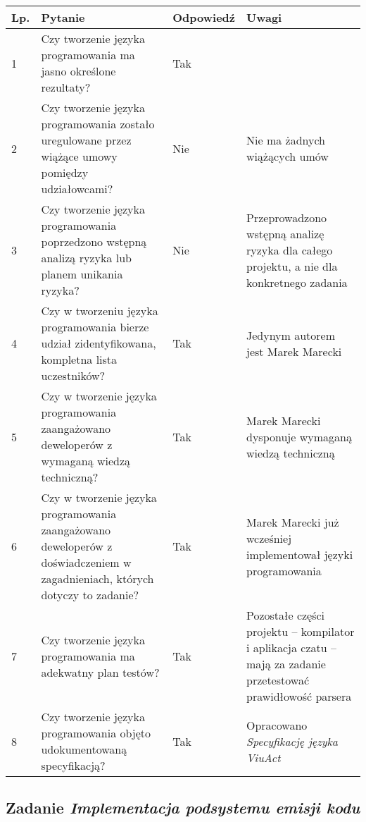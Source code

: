 \documentclass[11pt,oneside,a4paper,titlepage,onecolumn]{article}
\begin{document}
\begin{tabularx}{\textwidth}{|l|X|l|X|}
    \hline
    Lp. & Pytanie & Odpowiedź & Uwagi \\ \hline
    
    1 
    & Czy tworzenie języka programowania ma jasno określone 
    rezultaty?
    & Tak
    & 
    \\\hline
    
    2
	& Czy tworzenie języka programowania zostało uregulowane
	przez wiążące umowy pomiędzy udziałowcami?
	& Nie 
	& Nie ma żadnych wiążących umów
	\\\hline
	
	3
	& Czy tworzenie języka programowania poprzedzono wstępną analizą
	ryzyka lub planem unikania ryzyka?
	& Nie
	& Przeprowadzono wstępną analizę ryzyka dla całego projektu, a
	nie dla konkretnego zadania
	\\\hline
	
	4
	& Czy w tworzeniu języka programowania bierze udział 
	zidentyfikowana, kompletna lista uczestników?
	& Tak
	& Jedynym autorem jest Marek Marecki
	\\\hline
	
	5
	& Czy w tworzenie języka programowania zaangażowano deweloperów 
	z wymaganą wiedzą techniczną?
	& Tak
	& Marek Marecki dysponuje wymaganą wiedzą techniczną
	\\\hline
	
	6
	& Czy w tworzenie języka programowania zaangażowano deweloperów 
	z doświadczeniem w zagadnieniach, których dotyczy to zadanie?
	& Tak
	& Marek Marecki już wcześniej implementował języki programowania
	\\\hline
	
	7
	& Czy tworzenie języka programowania ma adekwatny plan testów?
	& Tak
	& Pozostałe części projektu -- kompilator i aplikacja czatu --
	mają za zadanie przetestować prawidłowość parsera
	\\\hline	
	
	8
	& Czy tworzenie języka programowania objęto udokumentowaną
	specyfikacją?
	& Tak
	& Opracowano \textit{Specyfikację języka ViuAct} 
	\\\hline

\end{tabularx}

\subsection{Zadanie \textit{Implementacja podsystemu emisji kodu}}
\end{document}
